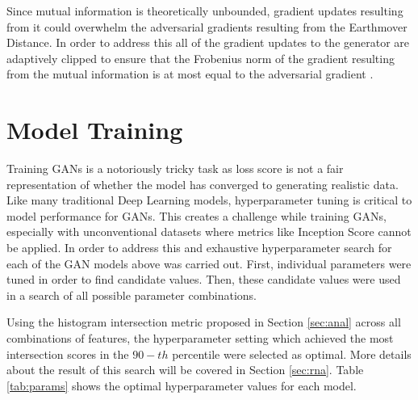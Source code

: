 Since mutual information is theoretically unbounded, gradient updates resulting from it could overwhelm the adversarial gradients resulting from the Earthmover Distance. In order to address this all of the gradient updates to the generator are adaptively clipped to ensure that the Frobenius norm of the gradient resulting from the mutual information is at most equal to the adversarial gradient \cite{Belghazi2018}.

\section{Model Training}

Training GANs is a notoriously tricky task as loss score is not a fair representation of whether the model has converged to generating realistic data. Like many traditional Deep Learning models, hyperparameter tuning is critical to model performance for GANs. This creates a challenge while training GANs, especially with unconventional datasets where metrics like Inception Score cannot be applied. In order to address this and exhaustive hyperparameter search for each of the GAN models above was carried out. First, individual parameters were tuned in order to find candidate values. Then, these candidate values were used in a search of all possible parameter combinations.

Using the histogram intersection metric proposed in Section \ref{sec:anal} across all combinations of features, the hyperparameter setting which achieved the most intersection scores in the $90-th$ percentile were selected as optimal. More details about the result of this search will be covered in Section \ref{sec:rna}. Table \ref{tab:params} shows the optimal hyperparameter values for each model.

